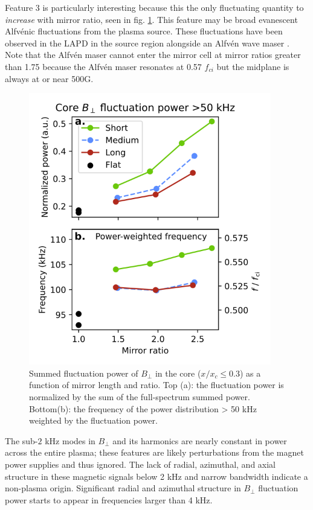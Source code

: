 Feature 3 is particularly interesting because
this the only fluctuating quantity to \textit{increase} with mirror ratio, seen in fig. \ref{fig:Bperp_core_highfreq}. This feature may be broad evanescent Alfv\'enic fluctuations from the plasma source.
These fluctuations have been observed in the LAPD in the source region alongside an Alfvén wave maser \cite{Maggs_2005}. Note that the Alfv\'en maser cannot enter the mirror cell at mirror ratios greater than 1.75 because the Alfv\'en maser resonates at 0.57 $f_{ci}$ but the midplane is always at or near 500G. 

\begin{figure}
    \centering
    \includegraphics[width=300pt]{figures/fig15.pdf}
    \caption[Summed fluctuation power of $B_\perp$ in the core]{Summed fluctuation power of $B_\perp$ in the core ($x/x_c \leq 0.3$) as a function of mirror length and ratio. Top (a): the fluctuation power is normalized by the sum of the full-spectrum summed power. Bottom(b): the frequency of the power distribution > 50 kHz weighted by the fluctuation power.}
    \label{fig:Bperp_core_highfreq}
\end{figure}

The sub-$2$ kHz modes in $B_\perp$ and its harmonics are nearly constant in power across the entire plasma; these features are likely perturbations from the magnet power supplies and thus ignored. The lack of radial, azimuthal, and axial structure in these magnetic signals below 2 kHz and narrow bandwidth indicate a non-plasma origin. Significant radial and azimuthal structure in $B_\perp$ fluctuation power starts to appear in frequencies larger than 4 kHz.

